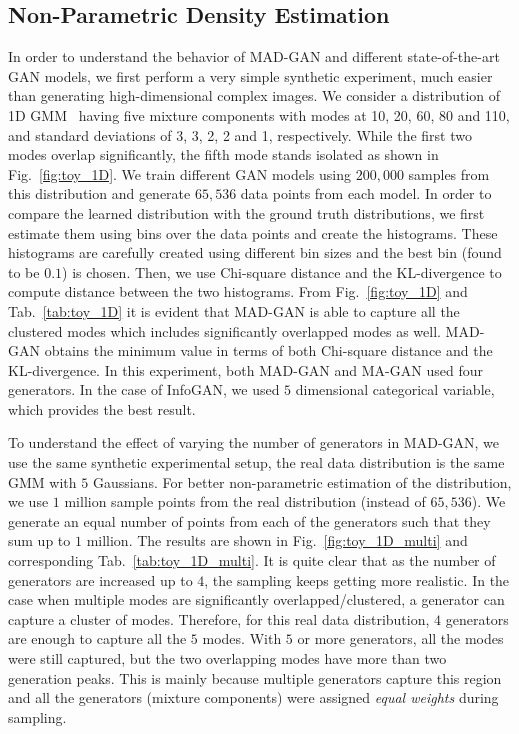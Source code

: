 \subsection{Non-Parametric Density Estimation}
\label{sec:toyExperiment}
In order to understand the behavior of MAD-GAN and different state-of-the-art GAN models, we first perform a very simple synthetic experiment, much easier than generating high-dimensional complex images. We consider a distribution of 1D GMM~\cite{bishop2007pattern} having five mixture components with modes at 10, 20, 60, 80 and 110, and standard deviations of 3, 3, 2, 2 and 1, respectively. While the first two modes overlap significantly, the fifth mode stands isolated as shown in Fig.~\ref{fig:toy_1D}. We train different GAN models using $200,000$ samples from this distribution and generate $65,536$ data points from each model. In order to compare the learned distribution with the ground truth distributions, we first estimate them using bins over the data points and create the histograms. These histograms are carefully created using different bin sizes and the best bin (found to be $0.1$) is chosen. Then, we use Chi-square distance and the KL-divergence to compute distance between the two histograms. From Fig.~\ref{fig:toy_1D} and Tab.~\ref{tab:toy_1D} it is evident that MAD-GAN is able to capture all the clustered modes which includes significantly overlapped modes as well. MAD-GAN obtains the minimum value in terms of both Chi-square distance and the KL-divergence. In this experiment, both MAD-GAN and MA-GAN used four generators. In the case of InfoGAN, we used $5$ dimensional categorical variable, which provides the best result. 

To understand the effect of varying the number of generators in MAD-GAN, we use the same synthetic experimental setup, \ie the real data distribution is the same GMM with $5$ Gaussians. For better non-parametric estimation of the distribution, we use $1$ million sample points from the real distribution (instead of $65,536$). We generate an equal number of points from each of the generators such that they sum up to $1$ million. The results are shown in Fig.~\ref{fig:toy_1D_multi} and corresponding Tab.~\ref{tab:toy_1D_multi}. It is quite clear that as the number of generators are increased up to $4$, the sampling keeps getting more realistic. In the case when multiple modes are significantly overlapped/clustered, a generator can capture a cluster of modes. Therefore, for this real data distribution, $4$ generators are enough to capture all the $5$ modes. With $5$ or more generators, all the modes were still captured, but the two overlapping modes have more than two generation peaks. This is mainly because multiple generators capture this region and all the generators (mixture components) were assigned {\em equal weights} during sampling.

